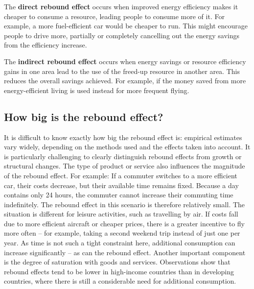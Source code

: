 \documentclass[
  a4paper,
  DIV=11,
  numbers=noendperiod,
  oneside,
  openany]{scrreprt}
\begin{document}
\begin{tcolorbox}[enhanced jigsaw, arc=.35mm, bottomrule=.15mm, bottomtitle=1mm, breakable, colback=white, colbacktitle=quarto-callout-note-color!10!white, colframe=quarto-callout-note-color-frame, coltitle=black, left=2mm, leftrule=.75mm, opacityback=0, opacitybacktitle=0.6, rightrule=.15mm, title={Rebound effects}, titlerule=0mm, toprule=.15mm, toptitle=1mm]

The \textbf{direct rebound effect} occurs when improved energy
efficiency makes it cheaper to consume a resource, leading people to
consume more of it. For example, a more fuel-efficient car would be
cheaper to run. This might encourage people to drive more, partially or
completely cancelling out the energy savings from the efficiency
increase.

The \textbf{indirect rebound effect} occurs when energy savings or
resource efficiency gains in one area lead to the use of the freed-up
resource in another area. This reduces the overall savings achieved. For
example, if the money saved from more energy-efficient living is used
instead for more frequent flying.

\end{tcolorbox}

\subsection{How big is the rebound
effect?}\label{how-big-is-the-rebound-effect}

It is difficult to know exactly how big the rebound effect is: empirical
estimates vary widely, depending on the methods used and the effects
taken into account. It is particularly challenging to clearly
distinguish rebound effects from growth or structural changes. The type
of product or service also influences the magnitude of the rebound
effect. For example: If a commuter switches to a more efficient car,
their costs decrease, but their available time remains fixed. Because a
day contains only 24 hours, the commuter cannot increase their commuting
time indefinitely. The rebound effect in this scenario is therefore
relatively small. The situation is different for leisure activities,
such as travelling by air. If costs fall due to more efficient aircraft
or cheaper prices, there is a greater incentive to fly more often -- for
example, taking a second weekend trip instead of just one per year. As
time is not such a tight constraint here, additional consumption can
increase significantly -- as can the rebound effect. Another important
component is the degree of saturation with goods and services.
Observations show that rebound effects tend to be lower in high-income
countries than in developing countries, where there is still a
considerable need for additional consumption.
\end{document}
